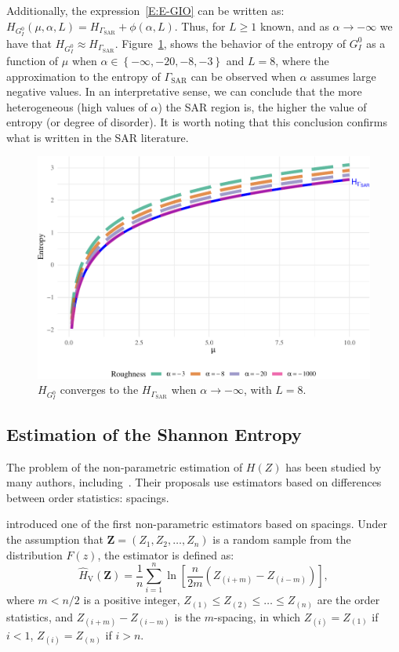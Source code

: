 Additionally, the expression~\eqref{E:E-GIO} can be written as: $H_{G_I^0}(\mu, \alpha, L)=H_{\Gamma_{\text{SAR}}}+\phi(\alpha, L)$. Thus, for $L\geq1$ known, and as \(\alpha\to-\infty\) we have that $H_{G_I^0}\approx H_{\Gamma_{\text{SAR}}}$. 
Figure~\ref{fig:Plot_GI0_to_gamma1}, shows the behavior of the entropy
of \(G_I^0\) as a function of $\mu$ when \(\alpha \in \left\{-\infty, -20, -8, -3\right\}\) and $L=8$,
where the approximation to the entropy of \(\Gamma_{\text{SAR}}\) can be
observed when \(\alpha\) assumes large negative values. In an
interpretative sense, we can conclude that the more heterogeneous (high
values of \(\alpha\)) the SAR region is, the higher the value of entropy
(or degree of disorder). It is worth noting that this conclusion
confirms what is written in the SAR literature.


\begin{figure}[htb]

{\centering \includegraphics[width=0.7\linewidth]{../../Figures/PDF/Plot_GI0_to_gamma1-1} 

}

\caption{$H_{ G_I^0}$ converges to the $H_{\Gamma_{\text{SAR}}}$ when $\alpha\to-\infty$, with $L=8$.}\label{fig:Plot_GI0_to_gamma1}
\end{figure}

\subsection{Estimation of the Shannon
Entropy}\label{estimation-of-the-shannon-entropy}

The problem of the non-parametric estimation of \(H(Z)\) has been
studied by many authors,
including~\citep{vasicek1976test,correa1995new,Wieczorkowski1999,Yee2015,AlOmari2019}.
Their proposals use estimators based on differences between order
statistics: spacings.

\citet{vasicek1976test} introduced one of the first
non-parametric estimators based on spacings. Under the assumption that
\(\bm{Z}=(Z_1, Z_2,\ldots,Z_n)\) is a random sample from the
distribution \(F(z)\), the estimator is defined as: \begin{equation}
\label{E:Vas}
    \widehat{H}_{\text{V}}(\bm{Z})=\frac{1}{n}\sum_{i=1}^{n}\ln\left[\frac{n}{2m}\left(Z_{(i+m)}-Z_{(i-m)}\right)\right],
    \end{equation} where \(m<n/2\) is a positive integer,
\(Z_{(1)}\leq Z_{(2)}\leq\dots\leq Z_{(n)}\) are the order statistics,
and \(Z_{(i+m)}-Z_{(i-m)}\) is the \(m\)-spacing, in which
\(Z_{(i)}= Z_{(1)}\) if \(i<1\), \(Z_{(i)}= Z_{(n)}\) if \(i>n\).

